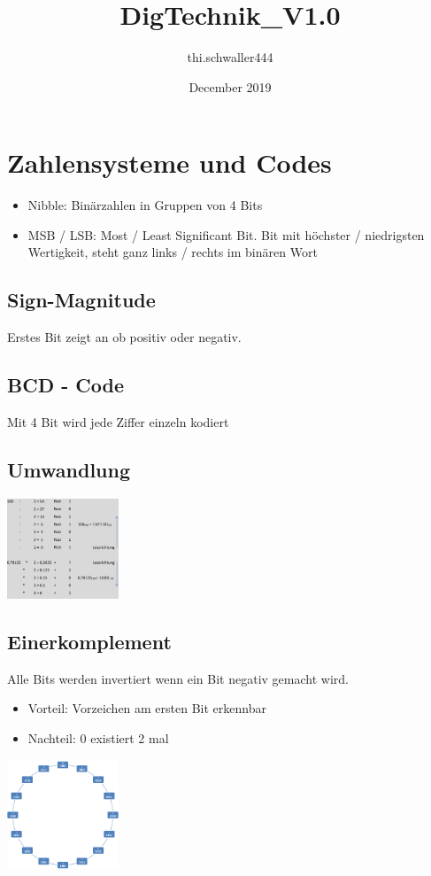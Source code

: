 \documentclass[10pt]{article}
\title{DigTechnik_V1.0}
\author{thi.schwaller444 }
\date{December 2019}
\begin{document}
\section{Zahlensysteme und Codes}
\begin{itemize}
    \item Nibble: Binärzahlen in Gruppen von 4 Bits
    \item MSB / LSB: Most / Least Significant Bit. Bit mit höchster / niedrigsten Wertigkeit, steht ganz links / rechts im binären Wort
\end{itemize}
\begin{multicols}{3}
\subsection{Sign-Magnitude}
Erstes Bit zeigt an ob positiv oder negativ.
\subsection{BCD - Code}
Mit 4 Bit wird jede Ziffer einzeln kodiert
\subsection{Umwandlung}
\includegraphics[width=0.25\textwidth]{Umwandlung.PNG}
\columnbreak
\subsection{Einerkomplement}
Alle Bits werden invertiert wenn ein Bit negativ gemacht wird.
\begin{itemize}
    \item Vorteil: Vorzeichen am ersten Bit erkennbar
    \item Nachteil: 0 existiert 2 mal
\end{itemize}
\includegraphics[width=0.25\textwidth]{Einerkomplement.PNG}
\columnbreak

\end{multicols}
\end{document}
